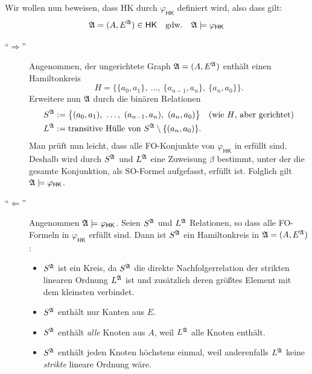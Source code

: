 \documentclass[fontsize=11pt, twoside=false, numbers=autoenddot]{scrbook}
\begin{document}
%
Wir wollen nun beweisen, dass HK durch $\varphi_{\textsf{HK}}$ definiert wird,
also dass gilt:
\[
  \mathfrak{A} = (A,E^\mathfrak{A}) \in \textsf{HK}
  \quad\text{gdw.}\quad
  \mathfrak{A} \models \varphi_{\textsf{HK}}
\]
\begin{beweis}
  \begin{description}
    \item[{\boldmath"`$\Rightarrow$"'}]
      Angenommen, der ungerichtete Graph $\mathfrak{A} = (A,E^\mathfrak{A})$ enthält einen Hamiltonkreis
      \[
        H = \big\{\{a_0,a_1\},~\dots,~\{a_{n-1},a_n\},~\{a_n,a_0\}\big\}.
      \]
      Erweitere nun $\mathfrak{A}$ durch die binären Relationen
      \begin{align*}
        S^\mathfrak{A} & := \big\{(a_0,a_1),~\dots,~(a_{n-1},a_n),~(a_n,a_0)\big\}\quad\text{(wie $H$, aber gerichtet)} \\
        L^\mathfrak{A} & := \text{transitive Hülle von~} S^\mathfrak{A} \setminus \{(a_n,a_0)\}.
      \end{align*}
      Man prüft nun leicht, dass alle FO-Konjunkte von $\varphi_{\textsf{HK}}$ in \Amf erfüllt sind.
      Deshalb wird durch $S^\mathfrak{A}$ und $L^\mathfrak{A}$ eine Zuweisung $\beta$ bestimmt,
      unter der die gesamte Konjunktion, als SO-Formel aufgefasst, erfüllt ist.
      Folglich gilt $\mathfrak{A} \models \varphi_{\textsf{HK}}$.
    \item[{\boldmath"`$\Leftarrow$"'}]
      Angenommen $\mathfrak{A} \models \varphi_{\textsf{HK}}$.
      Seien $S^\mathfrak{A}$ und $L^\mathfrak{A}$ Relationen, so dass alle FO-Formeln in $\varphi_{\textsf{HK}}$
      erfüllt sind. Dann ist $S^\mathfrak{A}$ ein Hamiltonkreis in $\mathfrak{A} = (A,E^\mathfrak{A})$:
      \begin{itemize}
        \item
          $S^\mathfrak{A}$ ist ein Kreis, da $S^\mathfrak{A}$ die direkte Nachfolgerrelation der strikten
          linearen Ordnung $L^\mathfrak{A}$ ist und zusätzlich deren größtes Element mit dem kleinsten verbindet.
        \item
          $S^\mathfrak{A}$ enthält nur Kanten aus $E$.
        \item
          $S^\mathfrak{A}$ enthält \emph{alle} Knoten aus $A$, weil $L^\mathfrak{A}$ alle Knoten enthält.
        \item
          $S^\mathfrak{A}$ enthält jeden Knoten höchstens einmal, weil anderenfalls $L^\mathfrak{A}$ keine \emph{strikte} lineare Ordnung wäre.
      \end{itemize}
      \qedhere
  \end{description}
\end{beweis}%

\goodbreak
\end{document}
